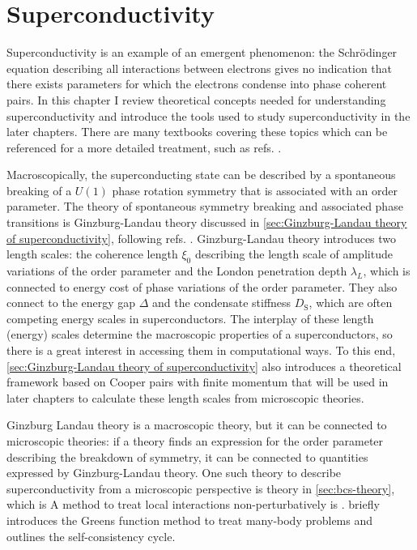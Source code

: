 \documentclass[../notes.tex]{subfiles}
\begin{document}
\raggedbottom

\chapter{Superconductivity}\label{ch:superconductivity}

Superconductivity is an example of an emergent phenomenon: the Schrödinger equation describing all interactions between electrons gives no indication that there exists parameters for which the electrons condense into phase coherent pairs.
In this chapter I review theoretical concepts needed for understanding superconductivity and introduce the tools used to study superconductivity in the later chapters.
There are many textbooks covering these topics which can be referenced for a more detailed treatment, such as refs. \cite{colemanIntroductionManyBodyPhysics2015, tinkhamIntroductionSuperconductivity1996, bruusManyBodyQuantumTheory2004, larkinTheoryFluctuationsSuperconductors2005, bennemannSuperconductivity2008}.

Macroscopically, the superconducting state can be described by a spontaneous breaking of a \(U(1)\) phase rotation symmetry that is associated with an order parameter.
The theory of spontaneous symmetry breaking and associated phase transitions is Ginzburg-Landau theory discussed in \cref{sec:Ginzburg-Landau theory of superconductivity}, following refs. \cite{beekmanIntroductionSpontaneousSymmetry2019, colemanIntroductionManyBodyPhysics2015}.
Ginzburg-Landau theory introduces two length scales: the coherence length \(\xi_0\) describing the length scale of amplitude variations of the order parameter and the London penetration depth \(\lambda_L\), which is connected to energy cost of phase variations of the order parameter.
They also connect to the energy gap \(\Delta\) and the condensate stiffness \(D_{\mathrm{S}}\), which are often competing energy scales in superconductors.
The interplay of these length (energy) scales determine the macroscopic properties of a superconductors, so there is a great interest in accessing them in computational ways.
To this end, \cref{sec:Ginzburg-Landau theory of superconductivity} also introduces a theoretical framework based on Cooper pairs with finite momentum \cite{wittBypassingLatticeBCS2024} that will be used in later chapters to calculate these length scales from microscopic theories.

Ginzburg Landau theory is a macroscopic theory, but it can be connected to microscopic theories: if a theory finds an expression for the order parameter describing the breakdown of symmetry, it can be connected to quantities expressed by Ginzburg-Landau theory.
One such theory to describe superconductivity from a microscopic perspective is  theory in \cref{sec:bcs-theory}, which is 
A method to treat local interactions non-perturbatively is .  briefly introduces the Greens function method to treat many-body problems and outlines the  self-consistency cycle.
\end{document}
